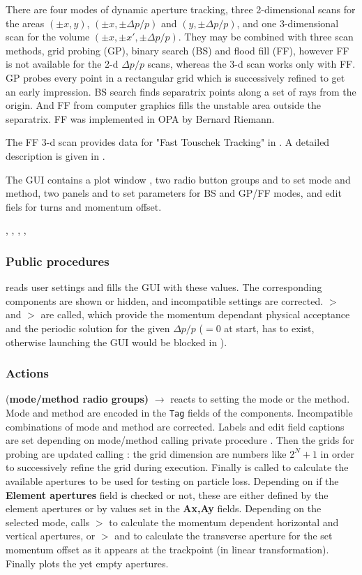 \documentclass[12pt]{article}
\newcommand\code[1]{{\tt #1}}
\newcommand{\ofld}[1]{\colorbox{black!15}{{{\color{black}\bf #1}}}}
\newcommand{\ofldx}[1]{\colorbox{black!15}{{\color{black}(#1)}}}
\newcommand\guico[1]{{\color{blue}\code{#1}}}
\newcommand{\unico}[1]{{\color{burntorange}\code{#1}}}
\newcommand{\evcodx}[2]{\ofldx{#1} $\rightarrow$ \guico{#2}}
\newcommand{\prcod}[2]{\opauni{#1}$>$\unico{#2}}
\newcommand{\opagui}[1]{\colorbox{blue!20}{{\color{black}\code{#1}}}}
\newcommand{\ogui}[1]{\hyperref[#1]{\opagui{#1}}}
\newcommand{\opaguif}[1]{\colorbox{violet!30}{{\color{black}\code{#1}}}}
\newcommand{\oguif}[1]{\hyperref[#1]{\opaguif{#1}}}
\newcommand{\opauni}[1]{\colorbox{orange!30}{{\color{black}\code{#1}}}}
\newcommand{\ouni}[1]{\hyperref[#1]{\opauni{#1}}}
\newcommand{\uses}[1]{\flushleft {\bf Uses:} #1}
\newcommand{\desc}[1]{#1}
\newcommand{\act}[1]{\subsubsection*{Actions} #1}
\newcommand{\ppro}[1]{\subsubsection*{Public procedures} #1}
\begin{document}
\desc{There are four modes of dynamic aperture tracking, three 2-dimensional scans for the areas $(\pm x,y)$, $(\pm x,\pm\Delta p/p)$ and $(y,\pm\Delta p/p)$, and one 3-dimensional scan for the volume $(\pm x, \pm x', \pm \Delta p/p)$. They may be combined with three scan methods, grid probing (GP), binary search (BS) and flood fill (FF), however FF is not available for the 2-d $\Delta p/p$ scans, whereas the 3-d scan works only with FF. GP probes every point in a rectangular grid which is successively refined to get an early impression. BS  search finds separatrix points along a set of rays from the origin. And FF from computer graphics fills the unstable area outside the separatrix.
FF was implemented in OPA by Bernard Riemann.

The FF 3-d scan provides data for "Fast Touschek Tracking" in \ogui{opatracktt}. A detailed description is given in \cite{FTTpaper}.

The GUI contains a plot window \guico{fig}, two radio button groups \guico{rgmode} and \guico{rgmeth} to set mode and method, two panels \guico{PanNray} and \guico{pangrid} to set parameters for BS and GP/FF modes, and edit fiels for turns and momentum offset.
}

\uses{\ouni{tracklib}, \ouni{globlib} \ouni{mathlib}, \oguif{comfigureframe}, \ouni{comvgraphlib}, \ouni{comauxlib}}


\ppro{
\guico{Start} reads user settings and fills the GUI with these values. The corresponding components are shown or hidden, and incompatible settings are corrected.
\prcod{tracklib}{Acc\_dpp} and \prcod{tracklib}{Initdpp} are called, which provide the momentum dependant physical acceptance and the periodic solution for the given $\Delta p/p$ ($=0$ at start, has to exist, otherwise launching the GUI would be blocked in \ogui{opamenu}).  
}

\act{}

\evcodx{\bf mode/method radio groups}{rbClick} reacts to setting the mode or the method. Mode and method are encoded in the \code{Tag} fields of the components. Incompatible combinations of mode and method are corrected. Labels and edit field captions are set depending on mode/method calling private procedure \guico{rbsetfields}. Then the grids for probing are updated calling \guico{UpdateGridParams}: the grid dimension are numbers like $2^N+1$ in order to successively refine the grid during execution. Finally \guico{UpdateApertures} is called to calculate the available apertures to be used for testing on particle loss. Depending on if the \ofld{Element apertures} field is checked or not, these are either defined by the element apertures or by values set in the \ofld{Ax,Ay} fields. Depending on the selected mode, \guico{UpdateApertures} calls  \prcod{tracklib}{Acc\_dpp} to calculate the momentum dependent horizontal and vertical apertures,  or \prcod{tracklib}{Initdpp} and \guico{Silhouette} to calculate the transverse aperture for the set momentum offset as it appears at the trackpoint (in linear transformation). Finally \guico{MakePlot} plots the yet empty apertures.
\end{document}
